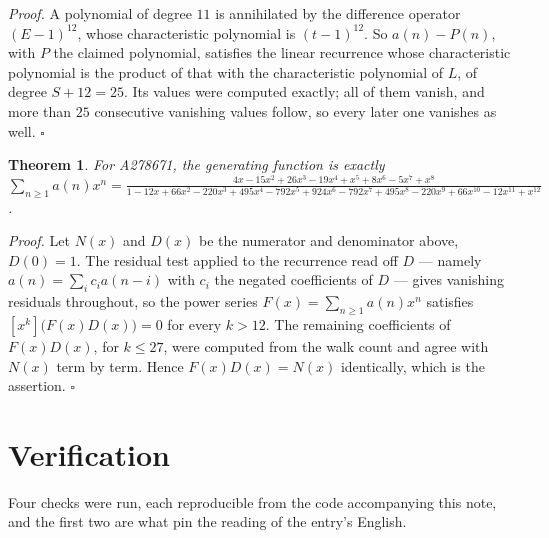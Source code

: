 \documentclass[11pt]{article}
\newtheorem{theorem}{Theorem}
\theoremstyle{definition}
\begin{document}
{\itshape Proof.} A polynomial of degree $11$ is annihilated by the difference operator $(E-1)^{12}$, whose characteristic polynomial is $(t-1)^{12}$. So $a(n) - P(n)$, with $P$ the claimed polynomial, satisfies the linear recurrence whose characteristic polynomial is the product of that with the characteristic polynomial of $L$, of degree $S + 12 = 25$. Its values were computed exactly; all of them vanish, and more than $25$ consecutive vanishing values follow, so every later one vanishes as well. $\square$

\begin{theorem} For A278671, the generating function is exactly $\sum_{n\ge 1} a(n)x^n = \frac{4x - 15x^{2} + 26x^{3} - 19x^{4} + x^{5} + 8x^{6} - 5x^{7} + x^{8}}{1 - 12x + 66x^{2} - 220x^{3} + 495x^{4} - 792x^{5} + 924x^{6} - 792x^{7} + 495x^{8} - 220x^{9} + 66x^{10} - 12x^{11} + x^{12}}$.\end{theorem}

{\itshape Proof.} Let $N(x)$ and $D(x)$ be the numerator and denominator above, $D(0)=1$. The residual test applied to the recurrence read off $D$ --- namely $a(n) = \sum_i c_i a(n-i)$ with $c_i$ the negated coefficients of $D$ --- gives vanishing residuals throughout, so the power series $F(x)=\sum_{n\ge 1}a(n)x^n$ satisfies $[x^k]\bigl(F(x)D(x)\bigr) = 0$ for every $k > 12$. The remaining coefficients of $F(x)D(x)$, for $k \le 27$, were computed from the walk count and agree with $N(x)$ term by term. Hence $F(x)D(x) = N(x)$ identically, which is the assertion. $\square$

\section{Verification}

Four checks were run, each reproducible from the code accompanying this note, and the first two are what pin the reading of the entry's English.
\end{document}
